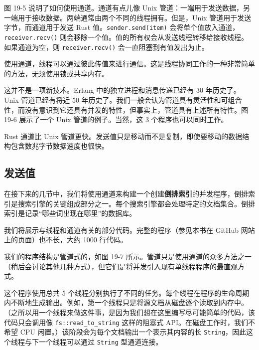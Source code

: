 图 19-5 说明了如何使用通道。通道有点儿像 Unix 管道：一端用于发送数据，另一端用于接收数据。两端通常由两个不同的线程拥有。但是，Unix 管道用于发送字节，而通道用于发送 Rust 值。\texttt{sender.send(item)} 会将单个值放入通道，\texttt{receiver.recv()} 则会移除一个值。值的所有权会从发送线程转移给接收线程。如果通道为空，则 \texttt{receiver.recv()} 会一直阻塞到有值发出为止。


使用通道，线程可以通过彼此传值来进行通信。这是线程协同工作的一种非常简单的方法，无须使用锁或共享内存。

这并不是一项新技术。Erlang 中的独立进程和消息传递已经有 30 年历史了。Unix 管道已经有将近 50 年历史了。我们一般会认为管道具有灵活性和可组合性，而没有意识到它还具有并发的特性，但事实上，管道具有上述所有特性。图 19-6 展示了一个 Unix 管道的例子。当然，这 3 个程序也可以同时工作。


Rust 通道比 Unix 管道更快。发送值只是移动而不是复制，即使要移动的数据结构包含数兆字节数据速度也很快。

\subsection{发送值}

在接下来的几节中，我们将使用通道来构建一个创建\textbf{倒排索引}的并发程序，倒排索引是搜索引擎的关键组成部分之一。每个搜索引擎都会处理特定的文档集合。倒排索引是记录“哪些词出现在哪里”的数据库。

我们将展示与线程和通道有关的部分代码。完整的程序（参见本书在 GitHub 网站上的页面）也不长，大约 1000 行代码。

我们的程序结构是管道式的，如图 19-7 所示。管道只是使用通道的众多方法之一（稍后会讨论其他几种方式），但它们是将并发引入现有单线程程序的最直观方式。


这个程序使用总共 5 个线程分别执行了不同的任务。每个线程在程序的生命周期内不断地生成输出。例如，第一个线程只是将源文档从磁盘逐个读取到内存中。（之所以用一个线程来做这件事，是因为我们想在这里编写尽可能简单的代码，该代码只会调用像 \texttt{fs::read\_to\_string} 这样的阻塞式 API。在磁盘工作时，我们不希望 CPU 闲置。）该阶段会为每个文档输出一个表示其内容的长 \texttt{String}，因此这个线程与下一个线程可以通过 \texttt{String} 型通道连接。

